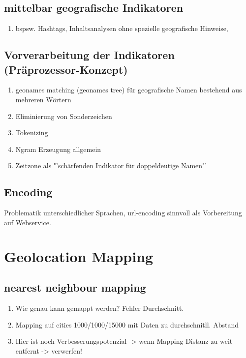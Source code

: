 	\subsection{mittelbar geografische Indikatoren}
		\begin{enumerate}
			\item bspsw. Hashtags, Inhaltsanalysen ohne spezielle geografische Hinweise, 
		\end{enumerate}

	
	\subsection{Vorverarbeitung der Indikatoren (Präprozessor-Konzept)}
		\begin{enumerate}
			\item geonames matching (geonames tree) für geografische Namen bestehend aus mehreren Wörtern
			\item Eliminierung von Sonderzeichen
			\item Tokenizing
			\item Ngram Erzeugung allgemein
			\item {} Zeitzone als "'schärfenden Indikator für doppeldeutige Namen"'
		\end{enumerate}

	\subsection{Encoding}
		Problematik unterschiedlicher Sprachen, 
		url-encoding sinnvoll als Vorbereitung auf Webservice. 

\section{Geolocation Mapping}

	\subsection{nearest neighbour mapping}
		\begin{enumerate}
			\item {} Wie genau kann gemappt werden? Fehler Durchschnitt. 
			\item Mapping auf cities 1000/1000/15000 mit Daten zu durchschnitll. Abstand
			\item Hier ist noch Verbesserungspotenzial -> wenn Mapping Distanz zu weit entfernt -> verwerfen! 
		\end{enumerate} 

